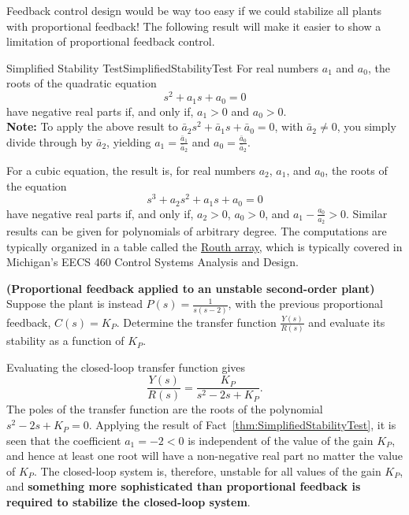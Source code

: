 \bigskip
Feedback control design would be way too easy if we could stabilize all plants with proportional feedback! The following result will make it easier to show a limitation of proportional feedback control.\\

\begin{factColor}{Simplified Stability Test}{SimplifiedStabilityTest}
For real numbers $a_1$ and $a_0$, the roots of the quadratic equation
\begin{equation}
\label{eqn:UnityFeedbackSystems:QuadraticEqn}
 s^2 + a_1 s + a_0=0
 \end{equation}
have negative real parts if, and only if, $a_1>0$ and $a_0>0$. \\

\textbf{Note:} To apply the above result to 
$ \bar{a}_2 s^2 + \bar{a}_1 s + \bar{a}_0=0$, with $\bar{a}_2\neq 0$, you simply divide through by $\bar{a}_2$, yielding $a_1 = \frac{\bar{a}_1}{\bar{a}_2}$ and $a_0 = \frac{\bar{a}_0}{\bar{a}_2}$.
\end{factColor}

For a cubic equation, the result is, for real numbers $a_2$, $a_1$, and $a_0$, the roots of the equation
$$
 s^3 + a_2 s^2 + a_1 s + a_0=0
 $$
have negative real parts if, and only if, $a_2>0$, $a_0>0$, and $a_1 - \frac{a_0}{a_2} >0$. Similar results can be given for polynomials of arbitrary degree. The computations are typically organized in a table called the \href{https://en.wikipedia.org/wiki/Routh%E2%80%93Hurwitz_stability_criterion#:~:text=of%20degree%202.-,Routh%E2%80%93Hurwitz%20criterion%20for%20second%2C%20third%20and%20fourth%2Dorder%20polynomials,-%5Bedit%5D}{Routh array}, which is typically covered in Michigan's EECS 460 Control Systems Analysis and Design.

\bigskip
\begin{example} {\bf (Proportional feedback applied to an unstable second-order plant)}
Suppose the plant is instead $P(s)=\frac{1}{s(s-2)}$, with the previous proportional feedback, $C(s) = K_P$. Determine the transfer function $\frac{Y(s)}{R(s)}$ and evaluate its stability as a function of $K_P$.
\end{example}

\solution
Evaluating the closed-loop transfer function gives
    $$ \frac{Y(s)}{R(s)} = \frac{K_P}{s^2 -2s + K_P}.$$
    The poles of the transfer function are the roots of the polynomial $s^2-2s+K_P=0$. Applying the result of Fact~\ref{thm:SimplifiedStabilityTest}, it is seen that the coefficient $a_1 = -2 <0$ is independent of the value of the gain $K_P$, and hence at least one root will have a non-negative real part no matter the value of $K_P$. The closed-loop system is, therefore, unstable for all values of the gain $K_P$, and \textbf{something more sophisticated than proportional feedback is required to stabilize the closed-loop system}.
\Qed


